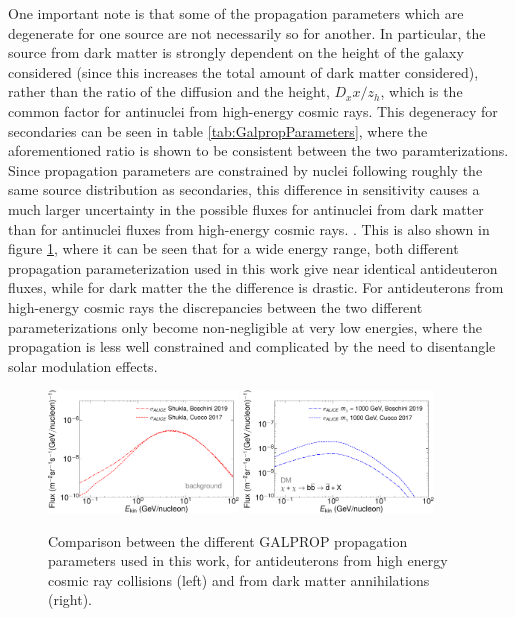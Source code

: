 One important note is that some of the propagation parameters which are degenerate for one source are not necessarily so for another. In particular, the source from dark matter is strongly dependent on the height of the galaxy considered (since this increases the total amount of dark matter considered), rather than the ratio of the diffusion and the height, $D_xx/z_h$, which is the common factor for antinuclei from high-energy cosmic rays. This degeneracy for secondaries can be seen in table \ref{tab:GalpropParameters}, where the aforementioned  ratio is shown to be consistent between the two paramterizations. Since propagation parameters are constrained by nuclei following roughly the same source distribution as secondaries, this difference in sensitivity causes a much larger uncertainty in the possible fluxes for antinuclei from dark matter than for antinuclei fluxes from high-energy cosmic rays. \cite{}. This is also shown in figure \ref{fig:ComparisonPropagation}, where it can be seen that for a wide energy range, both different propagation parameterization used in this work give near identical antideuteron fluxes, while for dark matter the the difference is drastic. For antideuterons from high-energy cosmic rays the discrepancies between the two different parameterizations only become non-negligible at very low energies, where the propagation is less well constrained and complicated by the need to disentangle solar modulation effects. 

\begin{figure}[hbtp]
    \centering
    \includegraphics[width=0.45\textwidth]{figures/ComparisonPropagationBoschini.pdf}
    \includegraphics[width=0.45\textwidth]{figures/ComparisonPropagationBoschiniDM.pdf}
    \caption{Comparison between the different GALPROP propagation parameters used in this work, for antideuterons from high energy cosmic ray collisions (left) and from dark matter annihilations (right).}
    \label{fig:ComparisonPropagation}
\end{figure}

